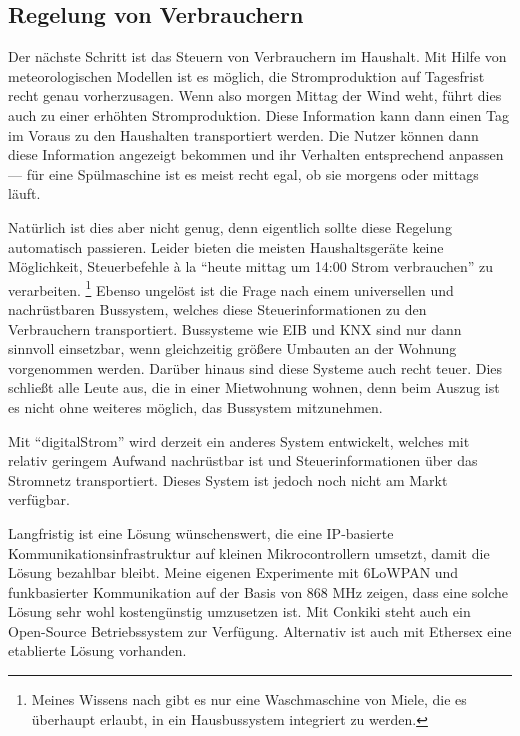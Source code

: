 \documentclass[12pt,BCOR=8.5mm]{scrartcl}
\begin{document}
\subsection{Regelung von Verbrauchern}\label{sub:steuern}

Der nächste Schritt ist das Steuern von Verbrauchern im Haushalt.
Mit Hilfe von meteorologischen Modellen ist es möglich, die
Stromproduktion auf Tagesfrist recht genau vorherzusagen. Wenn also
morgen Mittag der Wind weht, führt dies auch zu einer erhöhten
Stromproduktion. Diese Information kann dann einen Tag im Voraus zu den
Haushalten transportiert werden. Die Nutzer können dann diese
Information angezeigt bekommen und ihr Verhalten entsprechend anpassen
--- für eine Spülmaschine ist es meist recht egal, ob sie morgens oder
mittags läuft.

Natürlich ist dies aber nicht genug, denn eigentlich sollte diese
Regelung automatisch passieren. Leider bieten die meisten
Haushaltsgeräte keine Möglichkeit, Steuerbefehle à la "`heute mittag um
14:00 Strom verbrauchen"' zu verarbeiten. \footnote{Meines Wissens nach
gibt es nur eine Waschmaschine von Miele, die es überhaupt erlaubt, in
ein Hausbussystem integriert zu werden.} Ebenso ungelöst ist die Frage
nach einem universellen und nachrüstbaren Bussystem, welches diese
Steuerinformationen zu den Verbrauchern transportiert. Bussysteme wie
EIB und KNX sind nur dann sinnvoll einsetzbar, wenn gleichzeitig größere
Umbauten an der Wohnung vorgenommen werden. Darüber hinaus sind diese
Systeme auch recht teuer. Dies schließt alle Leute aus, die in einer
Mietwohnung wohnen, denn beim Auszug ist es nicht ohne weiteres
möglich, das Bussystem mitzunehmen.

Mit "`digitalStrom"' wird derzeit ein anderes System entwickelt, welches
mit relativ geringem Aufwand nachrüstbar ist und Steuerinformationen
über das Stromnetz transportiert. Dieses System ist jedoch noch nicht am
Markt verfügbar.

Langfristig ist eine Lösung wünschenswert, die eine IP-basierte
Kommunikationsinfrastruktur auf kleinen Mikrocontrollern umsetzt, damit
die Lösung bezahlbar bleibt. Meine eigenen Experimente mit 6LoWPAN und
funkbasierter Kommunikation auf der Basis von 868 MHz zeigen, dass eine
solche Lösung sehr wohl kostengünstig umzusetzen ist. Mit Conkiki  steht auch ein Open-Source
Betriebssystem zur Verfügung. Alternativ ist auch mit Ethersex
 eine etablierte Lösung vorhanden. 
\end{document}
